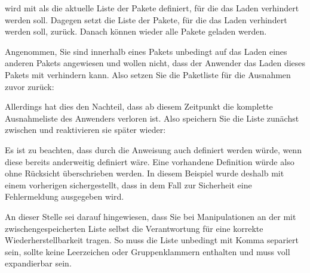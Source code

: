 \begin{Declaration}
\end{Declaration}
 wird mit
als die aktuelle Liste der Pakete definiert, für die das Laden verhindert
werden soll. Dagegen setzt
die Liste der Pakete, für die das Laden verhindert werden soll, zurück. Danach
können wieder alle Pakete geladen werden.
\begin{Example}
  Angenommen, Sie sind innerhalb eines Pakets unbedingt auf das Laden eines
  anderen Pakets angewiesen und wollen nicht, dass der Anwender das Laden
  dieses Pakets mit
  verhindern kann. Also setzen Sie die Paketliste für die Ausnahmen zuvor
  zurück:
\begin{lstcode}
  \ResetPreventPackageFromLoading
  \RequirePackage{foo}
\end{lstcode}
  Allerdings hat dies den Nachteil, dass ab diesem Zeitpunkt die komplette
  Ausnahmeliste des Anwenders verloren ist. Also speichern Sie die Liste
  zunächst zwischen und reaktivieren sie später wieder:
\begin{lstcode}
  \newcommand*{\Users@PreventList}{}%
  \StorePreventPackageFromLoading\Users@PreventList
  \ResetPreventPackageFromLoading
  \RequirePackage{foo}
  \PreventPackageFromLoading{\Users@PreventList}
\end{lstcode}
  Es ist zu beachten, dass  durch
  die Anweisung  auch definiert
  werden würde, wenn diese bereits anderweitig definiert wäre. Eine vorhandene
  Definition würde also ohne Rücksicht überschrieben werden. In diesem
  Beispiel wurde deshalb mit einem vorherigen 
  sichergestellt, dass in dem Fall zur Sicherheit eine Fehlermeldung
  ausgegeben wird.
\end{Example}
An dieser Stelle sei darauf hingewiesen, dass Sie bei Manipulationen an der mit
 zwischengespeicherten Liste selbst die
Verantwortung für eine korrekte Wiederherstellbarkeit tragen. So muss die
Liste unbedingt mit Komma separiert sein, sollte keine Leerzeichen oder
Gruppenklammern enthalten und muss voll expandierbar sein.%

